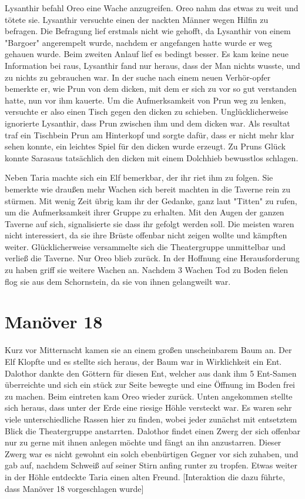 \documentclass[10pt,twoside,twocolumn,openany]{book}
\begin{document}
	Lysanthir befahl Oreo eine Wache anzugreifen. Oreo nahm das etwas zu weit und tötete sie. Lysanthir versuchte einen der nackten Männer wegen Hilfin zu befragen. Die Befragung lief erstmals nicht wie gehofft, da Lysanthir von einem "Bargoer" angerempelt wurde, nachdem er angefangen hatte wurde er weg gehauen wurde. Beim zweiten Anlauf lief es bedingt besser. Es kam keine neue Information bei raus, Lysanthir fand nur heraus, dass der Man nichts wusste, und zu nichts zu gebrauchen war. In der suche nach einem neuen Verhör-opfer bemerkte er, wie Prun von dem dicken, mit dem er sich zu vor so gut verstanden hatte, nun vor ihm kauerte. Um die Aufmerksamkeit von Prun weg zu lenken, versuchte er also einen Tisch gegen den dicken zu schieben. Unglücklicherweise ignorierte Lysanthir, dass Prun zwischen ihm und dem dicken war. Als resultat traf ein Tischbein Prun am Hinterkopf und sorgte dafür, dass er nicht mehr klar sehen konnte, ein leichtes Spiel für den dicken wurde erzeugt.  Zu Pruns Glück konnte Sarasaus tatsächlich den dicken mit einem Dolchhieb bewusstlos schlagen. 
	
	Neben Taria machte sich ein Elf bemerkbar, der ihr riet ihm zu folgen. Sie bemerkte wie draußen mehr Wachen sich bereit machten in die Taverne rein zu stürmen. Mit wenig Zeit übrig kam ihr der Gedanke, ganz laut "Titten" zu rufen, um die Aufmerksamkeit ihrer Gruppe zu erhalten. Mit den Augen der ganzen Taverne auf sich, signalisierte sie dass ihr gefolgt werden soll. Die meisten waren nicht interessiert, da sie ihre Brüste offenbar nicht zeigen wollte und kämpften weiter. Glücklicherweise versammelte sich die Theatergruppe unmittelbar und verließ die Taverne. Nur Oreo blieb zurück. In der Hoffnung eine Herausforderung zu haben griff sie weitere Wachen an. Nachdem 3 Wachen Tod zu Boden fielen flog sie aus dem Schornstein, da sie von ihnen gelangweilt war. 
	
	\section{Manöver 18}
	Kurz vor Mitternacht kamen sie an einem großen unscheinbarem Baum an. Der Elf Klopfte und es stellte sich heraus, der Baum war in Wirklichkeit ein Ent. Dalothor dankte den Göttern für diesen Ent, welcher aus dank ihm 5 Ent-Samen überreichte und sich ein stück zur Seite bewegte und eine Öffnung im Boden frei zu machen. Beim eintreten kam Oreo wieder zurück. Unten angekommen stellte sich heraus, dass unter der Erde eine riesige Höhle versteckt war. Es waren sehr viele unterschiedliche Rassen hier zu finden, wobei jeder zunächst mit entsetztem Blick die Theatergruppe anstarrten. Dalothor findet einen Zwerg der sich offenbar nur zu gerne mit ihnen anlegen möchte und fängt an ihn anzustarren. Dieser Zwerg war es nicht gewohnt ein solch ebenbürtigen Gegner vor sich zuhaben, und gab auf, nachdem Schweiß auf seiner Stirn anfing runter zu tropfen. Etwas weiter in der Höhle entdeckte Taria einen alten Freund. [Interaktion die dazu führte, dass Manöver 18 vorgeschlagen wurde]
	
\end{document}

